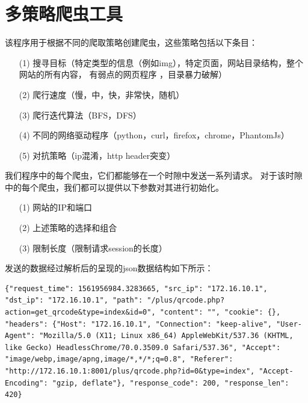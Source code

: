 \documentclass[doctor,privacy,twoside]{buaa_mac}
\begin{document}







\appendix

\section{多策略爬虫工具}
该程序用于根据不同的爬取策略创建爬虫，这些策略包括以下条目：

\begin{itemize}
\item[(1)] 搜寻目标（特定类型的信息（例如img），特定页面，网站目录结构，整个网站的所有内容， 有弱点的网页程序 ，目录暴力破解）
\item[(2)] 爬行速度（慢，中，快，非常快，随机）
\item[(3)] 爬行迭代算法（BFS，DFS）
\item[(4)] 不同的网络驱动程序（python，curl，firefox，chrome，PhantomJs）
\item[(5)] 对抗策略（ip混淆，http header突变）
\end {itemize}

我们程序中的每个爬虫，它们都能够在一个时隙中发送一系列请求。 对于该时隙中的每个爬虫，我们都可以提供以下参数对其进行初始化。

\begin{itemize}
\item[(1)] 网站的IP和端口
\item[(2)] 上述策略的选择和组合
\item[(3)] 限制长度（限制请求session的长度）
\end {itemize}

发送的数据经过解析后的呈现的json数据结构如下所示：
\lstset{language=JavaScript}
\begin{lstlisting}
{"request_time": 1561956984.3283665, "src_ip": "172.16.10.1", "dst_ip": "172.16.10.1", "path": "/plus/qrcode.php?action=get_qrcode&type=index&id=0", "content": "", "cookie": {}, "headers": {"Host": "172.16.10.1", "Connection": "keep-alive", "User-Agent": "Mozilla/5.0 (X11; Linux x86_64) AppleWebKit/537.36 (KHTML, like Gecko) HeadlessChrome/70.0.3509.0 Safari/537.36", "Accept": "image/webp,image/apng,image/*,*/*;q=0.8", "Referer": "http://172.16.10.1:8001/plus/qrcode.php?id=0&type=index", "Accept-Encoding": "gzip, deflate"}, "response_code": 200, "response_len": 420}
\end{lstlisting}
\end{document}
